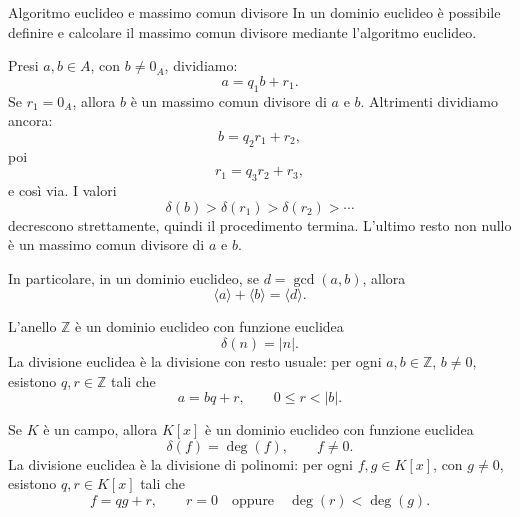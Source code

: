\documentclass[a4paper]{article}
\begin{document}
\begin{radioactive}
\begin{snippetremark}{Algoritmo euclideo e massimo comun divisore}
    In un dominio euclideo è possibile definire e calcolare il massimo comun divisore mediante l'algoritmo euclideo.

    Presi \(a,b\in A\), con \(b\neq 0_A\), dividiamo:
    \[
        a=q_1b+r_1.
    \]
    Se \(r_1=0_A\), allora \(b\) è un massimo comun divisore di \(a\) e \(b\).
    Altrimenti dividiamo ancora:
    \[
        b=q_2r_1+r_2,
    \]
    poi
    \[
        r_1=q_3r_2+r_3,
    \]
    e così via.
    I valori
    \[
        \delta(b)>\delta(r_1)>\delta(r_2)>\cdots
    \]
    decrescono strettamente, quindi il procedimento termina. L'ultimo resto non nullo è un massimo comun divisore di \(a\) e \(b\).

    In particolare, in un dominio euclideo, se \(d=\gcd(a,b)\), allora
    \[
        \langle a \rangle+\langle b \rangle=\langle d \rangle.
    \]
\end{snippetremark}
\end{radioactive}

\begin{radioactive}
\begin{snippetexample}{}
    L'anello \(\mathbb{Z}\) è un dominio euclideo con funzione euclidea
    \[
        \delta(n)=|n|.
    \]
    La divisione euclidea è la divisione con resto usuale:
    per ogni \(a,b\in\mathbb{Z}\), \(b\neq 0\), esistono \(q,r\in\mathbb{Z}\) tali che
    \[
        a=bq+r,
        \qquad
        0\leq r<|b|.
    \]
\end{snippetexample}
\end{radioactive}

\begin{radioactive}
\begin{snippetexample}{}
    Se \(K\) è un campo, allora \(K[x]\) è un dominio euclideo con funzione euclidea
    \[
        \delta(f)=\deg(f),
        \qquad
        f\neq 0.
    \]
    La divisione euclidea è la divisione di polinomi:
    per ogni \(f,g\in K[x]\), con \(g\neq 0\), esistono \(q,r\in K[x]\) tali che
    \[
        f=qg+r,
        \qquad
        r=0
        \quad
        \text{oppure}
        \quad
        \deg(r)<\deg(g).
    \]
\end{snippetexample}
\end{radioactive}
\end{document}
